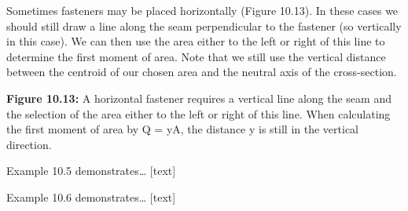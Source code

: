 \documentclass[
  letterpaper,
  DIV=11,
  numbers=noendperiod]{scrreprt}
\begin{document}
Sometimes fasteners may be placed horizontally (Figure 10.13). In these
cases we should still draw a line along the seam perpendicular to the
fastener (so vertically in this case). We can then use the area either
to the left or right of this line to determine the first moment of area.
Note that we still use the vertical distance between the centroid of our
chosen area and the neutral axis of the cross-section.

\textbf{Figure 10.13:} A horizontal fastener requires a vertical line
along the seam and the selection of the area either to the left or right
of this line. When calculating the first moment of area by Q = yA, the
distance y is still in the vertical direction.

Example 10.5 demonstrates\ldots{} {[}text{]}

Example 10.6 demonstrates\ldots{} {[}text{]}
\end{document}
